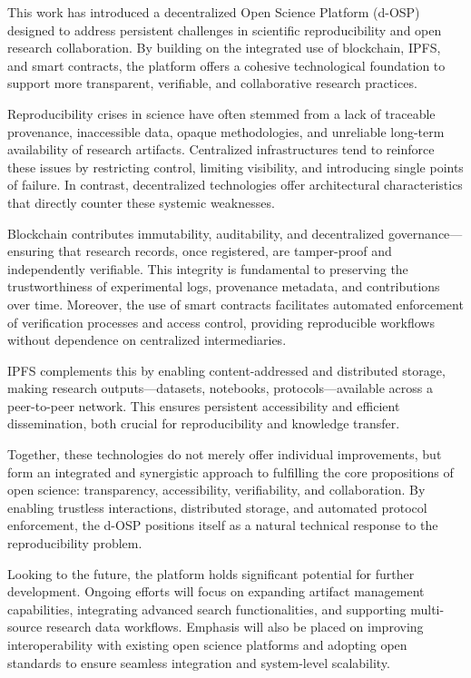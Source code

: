 \documentclass[final]{rc-book-2.14}
\begin{document}
\newpage

This work has introduced a decentralized Open Science Platform (d-OSP) designed to address persistent challenges in scientific reproducibility and open research collaboration. By building on the integrated use of blockchain, IPFS, and smart contracts, the platform offers a cohesive technological foundation to support more transparent, verifiable, and collaborative research practices.

Reproducibility crises in science have often stemmed from a lack of traceable provenance, inaccessible data, opaque methodologies, and unreliable long-term availability of research artifacts. Centralized infrastructures tend to reinforce these issues by restricting control, limiting visibility, and introducing single points of failure. In contrast, decentralized technologies offer architectural characteristics that directly counter these systemic weaknesses.

Blockchain contributes immutability, auditability, and decentralized governance—ensuring that research records, once registered, are tamper-proof and independently verifiable. This integrity is fundamental to preserving the trustworthiness of experimental logs, provenance metadata, and contributions over time. Moreover, the use of smart contracts facilitates automated enforcement of verification processes and access control, providing reproducible workflows without dependence on centralized intermediaries.

IPFS complements this by enabling content-addressed and distributed storage, making research outputs—datasets, notebooks, protocols—available across a peer-to-peer network. This ensures persistent accessibility and efficient dissemination, both crucial for reproducibility and knowledge transfer.

Together, these technologies do not merely offer individual improvements, but form an integrated and synergistic approach to fulfilling the core propositions of open science: transparency, accessibility, verifiability, and collaboration. By enabling trustless interactions, distributed storage, and automated protocol enforcement, the d-OSP positions itself as a natural technical response to the reproducibility problem.

Looking to the future, the platform holds significant potential for further development. Ongoing efforts will focus on expanding artifact management capabilities, integrating advanced search functionalities, and supporting multi-source research data workflows. Emphasis will also be placed on improving interoperability with existing open science platforms and adopting open standards to ensure seamless integration and system-level scalability.
\end{document}
